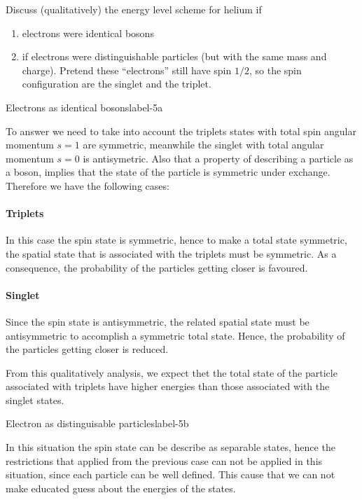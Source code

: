 \documentclass[../main.tex]{subfiles}
\begin{document}
Discuss (qualitatively) the energy level scheme for helium if
\begin{enumerate}
    \item electrons were identical bosons
    \item if electrons were distinguishable particles (but with the same mass and charge).
        Pretend these ``electrons'' still have spin $1/2$, so the spin configuration are the singlet and the triplet.
\end{enumerate}

\begin{sol}{Electrons as identical bosons}{label-5a}

To answer we need to take into account the triplets states with total spin angular momentum $s=1$ are symmetric, meanwhile the singlet with total angular momentum $s=0$ is antisymetric.
Also that a property of describing a particle as a boson, implies that the state of the particle is symmetric under exchange.
Therefore we have the following cases:
\paragraph{Triplets} In this case the spin state is symmetric, hence to make a total state symmetric, the spatial state that is associated with the triplets must be symmetric.
As a consequence, the probability of the particles getting closer is favoured.
\paragraph{Singlet} Since the spin state is antisymmetric, the related spatial state must be antisymmetric to accomplish a symmetric total state.
Hence, the probability of the particles getting closer is reduced.

From this qualitatively analysis, we expect thet the total state of the particle associated with triplets have higher energies than those associated with the singlet states.

\end{sol}


\begin{sol}{Electron as distinguisable particles}{label-5b}

In this situation the spin state can be describe as separable states, hence the restrictions that applied from the previous case can not be applied in this situation, since each particle can be well defined.
This cause that we can not make educated guess about the energies of the states.
\end{sol}
\end{document}
